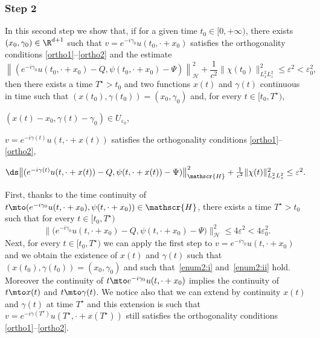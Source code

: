 \subsubsection*{Step 2} In this second step we show that, if for a given time $t_{0}\in[0,+\infty)$, there exists $(x_{0},\gamma_{0})\in\R^{d+1}$ such that $v=e^{-i\gamma_{0}}u(t_{0},\cdot+x_{0})$ satisfies the orthogonality conditions \eqref{ortho1}--\eqref{ortho2} and the estimate\vspace*{-3pt}
\[
\left\|(e^{-i\gamma_{0}}u(t_{0},\cdot+x_{0})-Q,\psi(t_{0},\cdot+x_{0})-\Psi)\right\|_{\mathscr{H}}^{2}+\frac{1}{c^{2}}\|\chi(t_{0})\|_{L_{x}^{2}L_{z}^{2}}^{2}\leq\varepsilon^{2}<\varepsilon_{0}^{2},
\]
then there exists a time $T^{\star}>t_{0}$ and two functions $x(t)$ and $\gamma(t)$ continuous in time such that $(x(t_{0}),\gamma(t_{0}))=(x_{0},\gamma_{0})$ and, for every $t\in[t_{0},T^{\star})$,
\begin{enumeratei}
\item\label{enum2:i}
$(x(t)-x_{0},\gamma(t)-\gamma_{0})\in U_{\varepsilon_{0}}$,
\item\label{enum2:ii}
$v=e^{-i\gamma(t)}u(t,\cdot+x(t))$ satisfies the orthogonality conditions \eqref{ortho1}--\eqref{ortho2},
\item\label{enum2:iii}
$\ds\bigl\|(e^{-i\gamma(t)}u(t,\cdot+x(t))-Q,\psi(t,\cdot+x(t))-\Psi)\bigr\|_{\mathscr{H}}^{2}+\frac{1}{c^{2}}\|\chi(t)\|_{L_{x}^{2}L_{z}^{2}}^{2}\leq\varepsilon^{2}.$
\end{enumeratei}
First, thanks to the time continuity of $t\mto(e^{-i\gamma_{0}}u(t,\cdot+x_{0}),\psi(t,\cdot+x_{0}))\in\mathscr{H}$, there exists a time $T^{\star}>t_{0}$ such that for every $t\in[t_{0},T^{\star})$\vspace*{-3pt}
\[
\bigl\|\bigl(e^{-i\gamma_{0}}u(t,\cdot+x_{0})-Q,\psi(t,\cdot+x_{0})-\Psi\bigr)\bigr\|_{\mathscr{H}}^{2}\leq 4\varepsilon^{2}<4\varepsilon_{0}^{2}.
\]
Next, for every $t\in[t_{0},T^{\star})$ we can apply the first step to $v=e^{-i\gamma_{0}}u(t,\cdot+x_{0})$ and we obtain the existence of $x(t)$ and $\gamma(t)$ such that $(x(t_{0}),\gamma(t_{0}))=(x_{0},\gamma_{0})$ and such that~\eqref{enum2:i} and~\eqref{enum2:ii} hold. Moreover the continuity of $t\mto e^{-i\gamma_{0}}u(t,\cdot+x_{0})$ implies the continuity of $t\mto x(t)$ and $t\mto\gamma(t)$. We notice also that we can extend by continuity $x(t)$ and $\gamma(t)$ at time $T^{\star}$ and this extension is such that $v=e^{-i\gamma(T^{\star})}u(T^{\star},\cdot+x(T^{\star}))$ still satisfies the orthogonality conditions \eqref{ortho1}--\eqref{ortho2}.

